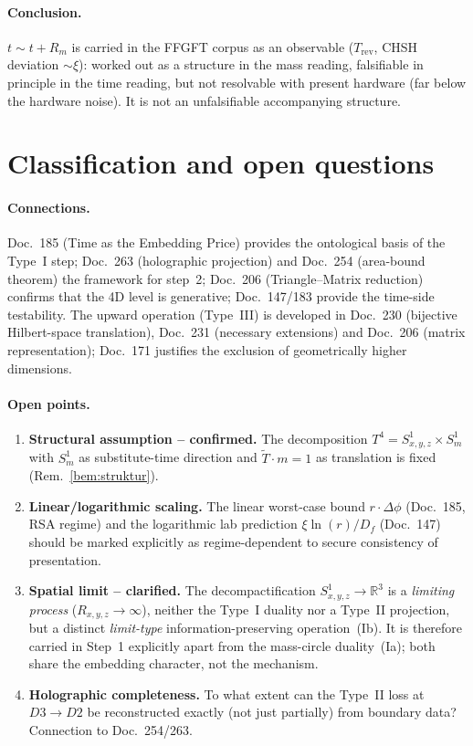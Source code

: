 \paragraph{Conclusion.}
$t\sim t+R_m$ is carried in the FFGFT corpus as an observable ($T_\text{rev}$,
CHSH deviation $\sim\xi$): worked out as a structure in the mass reading,
falsifiable in principle in the time reading, but not resolvable with present hardware (far below the hardware noise). It is not an unfalsifiable accompanying structure.

\section{Classification and open questions}\label{sec:offen}

\paragraph{Connections.}
Doc.~185 (Time as the Embedding Price) provides the ontological basis of the
Type~I step; Doc.~263 (holographic projection) and Doc.~254 (area-bound theorem)
the framework for step~2; Doc.~206 (Triangle--Matrix reduction) confirms that
the 4D level is generative; Doc.~147/183 provide the time-side testability. The upward operation (Type~III)
is developed in Doc.~230 (bijective Hilbert-space translation), Doc.~231
(necessary extensions) and Doc.~206 (matrix representation); Doc.~171 justifies
the exclusion of geometrically higher dimensions.

\paragraph{Open points.}
\begin{enumerate}
  \item \textbf{Structural assumption -- confirmed.} The decomposition
  $T^4 = S^1_{x,y,z}\times S^1_m$ with $S^1_m$ as substitute-time direction and
  $\tilde{T}\cdot m = 1$ as translation is fixed (Rem.~\ref{bem:struktur}).
  \item \textbf{Linear/logarithmic scaling.} The linear worst-case bound
  $r\cdot\Delta\phi$ (Doc.~185, RSA regime) and the logarithmic lab prediction
  $\xi\ln(r)/D_f$ (Doc.~147) should be marked explicitly as regime-dependent to
  secure consistency of presentation.
  \item \textbf{Spatial limit -- clarified.} The decompactification
  $S^1_{x,y,z}\to\mathbb{R}^3$ is a \emph{limiting process}
  ($R_{x,y,z}\to\infty$), neither the Type~I duality nor a Type~II projection,
  but a distinct \emph{limit-type} information-preserving operation~(Ib). It is
  therefore carried in Step~1 explicitly apart from the mass-circle duality~(Ia);
  both share the embedding character, not the mechanism.
  \item \textbf{Holographic completeness.} To what extent can the Type~II loss
  at $D3\to D2$ be reconstructed exactly (not just partially) from boundary
  data? Connection to Doc.~254/263.
\end{enumerate}
